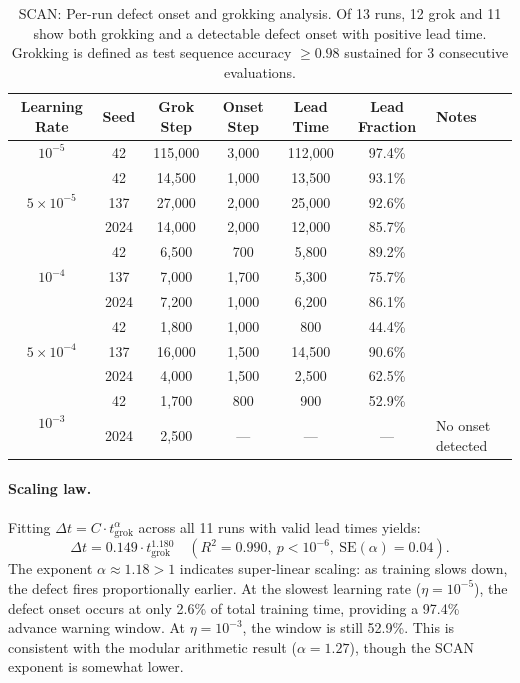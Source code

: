 \documentclass[11pt]{article}
\newcommand{\grokstep}{t_{\text{grok}}}
\newcommand{\leadtime}{\Delta t}
\begin{document}
\begin{table}[t]
  \centering
  \caption{SCAN: Per-run defect onset and grokking analysis. Of 13 runs, 12 grok and 11 show both grokking and a detectable defect onset with positive lead time. Grokking is defined as test sequence accuracy $\geq 0.98$ sustained for 3 consecutive evaluations.}
  \label{tab:scan_runs}
  \small
  \begin{tabular}{@{}ccccccp{3cm}@{}}
    \toprule
    Learning Rate & Seed & Grok Step & Onset Step & Lead Time & Lead Fraction & Notes \\
    \midrule
    $10^{-5}$ & 42 & 115,000 & 3,000 & 112,000 & 97.4\% & \\
    \midrule
    \multirow{3}{*}{$5{\times}10^{-5}$} & 42 & 14,500 & 1,000 & 13,500 & 93.1\% & \\
    & 137 & 27,000 & 2,000 & 25,000 & 92.6\% & \\
    & 2024 & 14,000 & 2,000 & 12,000 & 85.7\% & \\
    \midrule
    \multirow{3}{*}{$10^{-4}$} & 42 & 6,500 & 700 & 5,800 & 89.2\% & \\
    & 137 & 7,000 & 1,700 & 5,300 & 75.7\% & \\
    & 2024 & 7,200 & 1,000 & 6,200 & 86.1\% & \\
    \midrule
    \multirow{3}{*}{$5{\times}10^{-4}$} & 42 & 1,800 & 1,000 & 800 & 44.4\% & \\
    & 137 & 16,000 & 1,500 & 14,500 & 90.6\% & \\
    & 2024 & 4,000 & 1,500 & 2,500 & 62.5\% & \\
    \midrule
    \multirow{2}{*}{$10^{-3}$} & 42 & 1,700 & 800 & 900 & 52.9\% & \\
    & 2024 & 2,500 & --- & --- & --- & No onset detected \\
    \bottomrule
  \end{tabular}
\end{table}

\paragraph{Scaling law.} Fitting $\leadtime = C \cdot \grokstep^\alpha$ across all 11 runs with valid lead times yields:
\begin{equation}
  \leadtime = 0.149 \cdot \grokstep^{1.180} \quad (R^2 = 0.990,\ p < 10^{-6},\ \text{SE}(\alpha) = 0.04).
  \label{eq:scan_scaling}
\end{equation}
The exponent $\alpha \approx 1.18 > 1$ indicates super-linear scaling: as training slows down, the defect fires proportionally earlier. At the slowest learning rate ($\eta = 10^{-5}$), the defect onset occurs at only 2.6\% of total training time, providing a 97.4\% advance warning window. At $\eta = 10^{-3}$, the window is still 52.9\%. This is consistent with the modular arithmetic result ($\alpha = 1.27$), though the SCAN exponent is somewhat lower.
\end{document}
